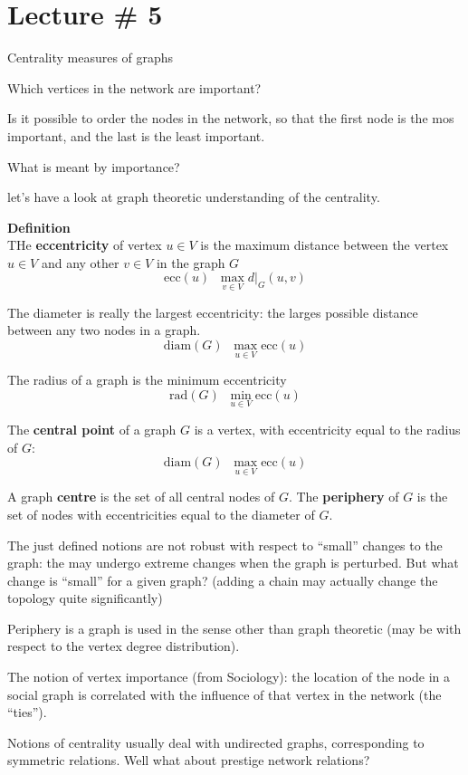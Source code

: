 \documentclass[a4paper]{article}
\newcommand{\induc}[1]{{\left . #1 \right \vert}}
\newcommand{\defn}{\mathop{\overset{\Delta}{=}}\nolimits}
\begin{document}

\section{Lecture \# 5} %
\label{sec:lecture_5}

Centrality measures of graphs

Which vertices in the network are important?

Is it possible to order the nodes in the network, so that the first node is the mos important, and the last is the least important.

What is meant by importance?

let's have a look at graph theoretic understanding of the centrality.

\noindent\textbf{Definition}\hfill\\
THe \textbf{eccentricity} of vertex $u\in V$ is the maximum distance between the vertex $u\in V$ and any other $v\in V$ in the graph $G$ 
\[\text{ecc}(u) \defn \max_{v\in V}\induc{d}_G(u,v)\]

The diameter is really the largest eccentricity: the larges possible distance between any two nodes in a graph.
\[\text{diam}(G)\defn \max_{u\in V} \text{ecc}(u)\]

The radius of a graph is the minimum eccentricity
\[\text{rad}(G)\defn \min_{u\in V} \text{ecc}(u)\]

The \textbf{central point} of a graph $G$ is a vertex, with eccentricity equal to the radius of $G$:
\[\text{diam}(G)\defn \max_{u\in V} \text{ecc}(u)\]

A graph \textbf{centre} is the set of all central nodes of $G$. The \textbf{periphery} of $G$ is the set of nodes with eccentricities equal to the diameter of $G$.

The just defined notions are not robust with respect to ``small'' changes to the graph: the may undergo extreme changes when the graph is perturbed. But what change is ``small'' for a given graph? (adding a chain may actually change the topology quite significantly)


Periphery is a graph is used in the sense other than graph theoretic (may be with respect to the vertex degree distribution).

The notion of vertex importance (from Sociology): the location of the node in a social graph is correlated with the influence of that vertex in the network (the ``ties'').

Notions of centrality usually deal with undirected graphs, corresponding to symmetric relations. Well what about prestige network relations?
\end{document}
